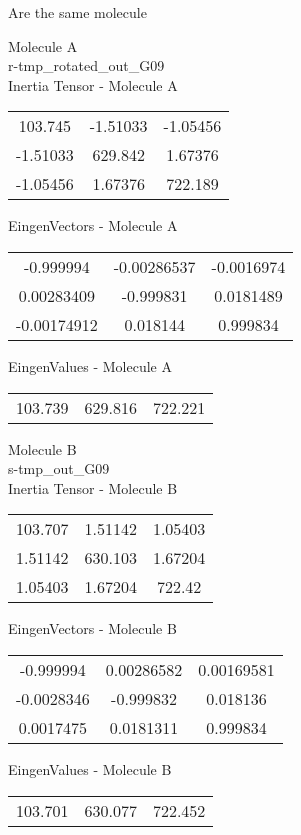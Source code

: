 \begin{center}
\vtab
\vtab
\textcolor{NavyBlue}{\Large Are the same molecule}
\end{center}
\newpage
\begin{multicols}{2}
\begin{center}
Molecule A \\ 
r-tmp\_rotated\_out\_G09
\\
Inertia Tensor - Molecule A \\
\vtab
\begin{tabular}{|c c c|}
103.745	 & 	-1.51033	 & 	-1.05456	 \\
-1.51033	 & 	629.842	 & 	1.67376	 \\
-1.05456	 & 	1.67376	 & 	722.189
\end{tabular}

\vtab
 EingenVectors - Molecule A     \\
\vtab
\begin{tabular}{|c c c|}
-0.999994	 & 	-0.00286537	 & 	-0.0016974	 \\
0.00283409	 & 	-0.999831	 & 	0.0181489	 \\
-0.00174912	 & 	0.018144	 & 	0.999834
\end{tabular}

\vtab
 EingenValues - Molecule A     \\
\vtab
\begin{tabular}{|c c c|}
103.739	 & 	629.816	 & 	722.221
\end{tabular}
\columnbreak

Molecule B \\ 
s-tmp\_out\_G09
\\
Inertia Tensor - Molecule B \\
\vtab
\begin{tabular}{|c c c|}
103.707	 & 	1.51142	 & 	1.05403	 \\
1.51142	 & 	630.103	 & 	1.67204	 \\
1.05403	 & 	1.67204	 & 	722.42
\end{tabular}

\vtab
 EingenVectors - Molecule B     \\
\vtab
\begin{tabular}{|c c c|}
-0.999994	 & 	0.00286582	 & 	0.00169581	 \\
-0.0028346	 & 	-0.999832	 & 	0.018136	 \\
0.0017475	 & 	0.0181311	 & 	0.999834
\end{tabular}

\vtab
 EingenValues - Molecule B     \\
\vtab
\begin{tabular}{|c c c|}
103.701	 & 	630.077	 & 	722.452
\end{tabular}

\end{center}
\end{multicols}
